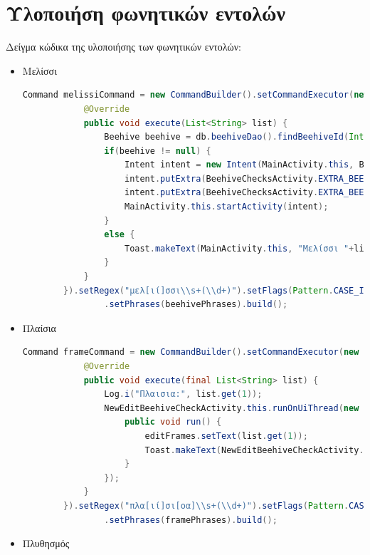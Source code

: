 \documentclass[oneside, 12pt]{book}
\begin{document}
\section{Υλοποιήση φωνητικών εντολών}
Δείγμα κώδικα της υλοποιήσης των φωνητικών εντολών:
\begin{itemize}
	\item Μελίσσι
	\begin{lstlisting}[language=java]
Command melissiCommand = new CommandBuilder().setCommandExecutor(new CommandExecutor() {
            @Override
            public void execute(List<String> list) {
                Beehive beehive = db.beehiveDao().findBeehiveId(Integer.parseInt(list.get(1)));
                if(beehive != null) {
                    Intent intent = new Intent(MainActivity.this, BeehiveChecksActivity.class);
                    intent.putExtra(BeehiveChecksActivity.EXTRA_BEEHIVE_NUMBER, beehive.number);
                    intent.putExtra(BeehiveChecksActivity.EXTRA_BEEHIVE_ID, beehive.id);
                    MainActivity.this.startActivity(intent);
                }
                else {
                    Toast.makeText(MainActivity.this, "Μελίσσι "+list.get(1)+" δεν υπάρχει!", Toast.LENGTH_LONG).show();
                }
            }
        }).setRegex("μελ[ιί]σσι\\s+(\\d+)").setFlags(Pattern.CASE_INSENSITIVE|Pattern.DOTALL)
                .setPhrases(beehivePhrases).build();
	\end{lstlisting}
    \item Πλαίσια
	\begin{lstlisting}[language=java]
	Command frameCommand = new CommandBuilder().setCommandExecutor(new CommandExecutor() {
            @Override
            public void execute(final List<String> list) {
                Log.i("Πλαισια:", list.get(1));
                NewEditBeehiveCheckActivity.this.runOnUiThread(new Runnable() {
                    public void run() {
                        editFrames.setText(list.get(1));
                        Toast.makeText(NewEditBeehiveCheckActivity.this, "Πλαίσιο " + list.get(1) + "!", Toast.LENGTH_LONG).show();
                    }
                });
            }
        }).setRegex("πλα[ιί]σι[οα]\\s+(\\d+)").setFlags(Pattern.CASE_INSENSITIVE | Pattern.DOTALL)
                .setPhrases(framePhrases).build();
    \end{lstlisting}
    \item Πλυθησμός

\end{itemize}
\end{document}
